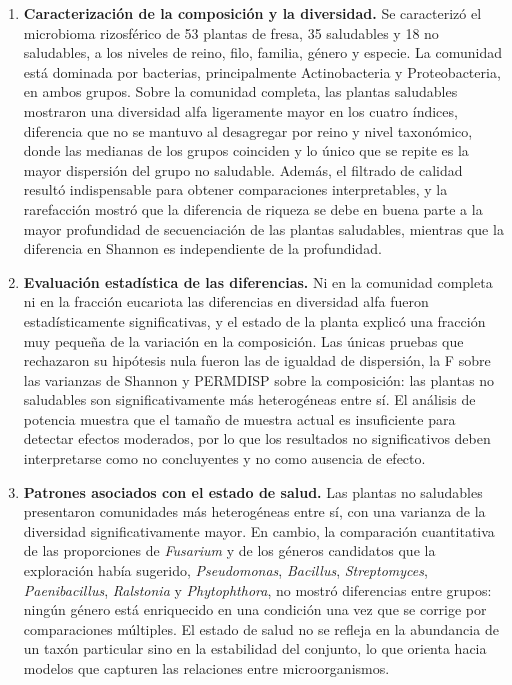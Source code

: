\begin{enumerate}
    \item \textbf{Caracterización de la composición y la diversidad.} Se caracterizó el microbioma
    rizosférico de 53 plantas de fresa, 35 saludables y 18 no saludables, a los niveles de reino,
    filo, familia, género y especie. La comunidad está dominada por bacterias, principalmente
    Actinobacteria y Proteobacteria, en ambos grupos. Sobre la comunidad completa, las plantas
    saludables mostraron una diversidad alfa ligeramente mayor en los cuatro índices, diferencia que
    no se mantuvo al desagregar por reino y nivel taxonómico, donde las medianas de los grupos
    coinciden y lo único que se repite es la mayor dispersión del grupo no saludable.
    Además, el filtrado de calidad resultó indispensable para obtener comparaciones interpretables,
    y la rarefacción mostró que la diferencia de riqueza se debe en buena parte a la mayor
    profundidad de secuenciación de las plantas saludables, mientras que la diferencia en Shannon es
    independiente de la profundidad.

    \item \textbf{Evaluación estadística de las diferencias.} Ni en la comunidad completa ni en la
    fracción eucariota las diferencias en diversidad alfa fueron estadísticamente significativas, y
    el estado de la planta explicó una fracción muy pequeña de la variación en la composición. Las
    únicas pruebas que rechazaron su hipótesis nula fueron las de igualdad de dispersión, la F
    sobre las varianzas de Shannon y PERMDISP sobre la composición: las plantas no saludables son
    significativamente más heterogéneas entre sí. El análisis de potencia muestra que
    el tamaño de muestra actual es insuficiente para detectar efectos moderados, por lo que los
    resultados no significativos deben interpretarse como no concluyentes y no como ausencia de
    efecto.

    \item \textbf{Patrones asociados con el estado de salud.} Las plantas no saludables presentaron
    comunidades más heterogéneas entre sí, con una varianza de la diversidad significativamente
    mayor. En cambio, la comparación cuantitativa de las proporciones de \textit{Fusarium} y de
    los géneros candidatos que la exploración había sugerido, \textit{Pseudomonas}, \textit{Bacillus},
    \textit{Streptomyces}, \textit{Paenibacillus}, \textit{Ralstonia} y \textit{Phytophthora}, no mostró
    diferencias entre grupos: ningún género está enriquecido en una condición una vez que se
    corrige por comparaciones múltiples. El estado de salud no se refleja en la abundancia de un
    taxón particular sino en la estabilidad del conjunto, lo que orienta hacia modelos que capturen
    las relaciones entre microorganismos.


\end{enumerate}

